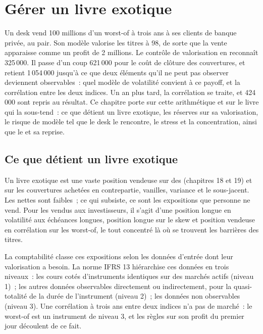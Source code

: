 \chapter{Gérer un livre exotique}\label{ch:dv:managing-an-exotic-book}

Un desk vend 100 millions d'un  worst-of à trois ans à ses clients de banque privée, au pair. Son modèle valorise les titres à 98, de sorte que la vente apparaisse
comme un profit de 2 millions. Le contrôle de valorisation en reconnaît 325\,000. Il passe d'un coup 621\,000 pour le coût de clôture des couvertures, et retient
1\,054\,000 jusqu'à ce que deux éléments qu'il ne peut pas observer deviennent observables~: quel modèle de volatilité convient à ce payoff, et la corrélation entre les
deux indices. Un an plus tard, la corrélation se traite, et 424\,000 sont repris au résultat. Ce chapitre porte sur cette arithmétique et sur le livre qui la sous-tend~: ce que détient un livre exotique,
les réserves sur sa valorisation, le risque de modèle tel que le desk le rencontre, le stress et la concentration, ainsi que le  et sa reprise.

\section{Ce que détient un livre exotique}

Un livre exotique est une vaste position vendeuse sur des  (chapitres 18 et 19) et sur les couvertures achetées en contrepartie, vanilles, variance et
le sous-jacent. Les  nettes sont faibles~; ce qui subsiste, ce sont les expositions que personne ne vend. Pour les  vendus aux investisseurs, il s'agit d'une position longue en volatilité aux
échéances longues, position longue sur le skew et position vendeuse en corrélation sur les worst-of, le tout concentré là où se trouvent les barrières des titres.

La comptabilité classe ces expositions selon les données d'entrée dont leur valorisation a besoin. La norme IFRS 13 hiérarchise ces données en trois niveaux~: les cours cotés d'instruments identiques sur
des marchés actifs (niveau 1)~; les autres données observables directement ou indirectement, pour la quasi-totalité de la durée de l'instrument (niveau 2)~; les données non observables
(niveau 3). Une corrélation à trois ans entre deux indices n'a pas de marché~: le worst-of est un instrument de niveau 3, et les règles sur son profit du premier jour
découlent de ce fait.

